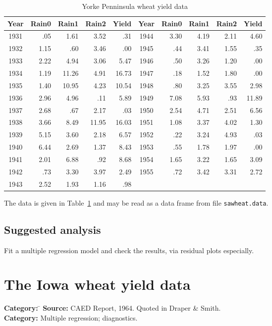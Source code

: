 \documentclass{article}
\newcommand{\strutt}{\vrule height 2.5ex depth 0.5ex width 0ex}%
\newcommand{\code}[1]{\texttt{#1}}
\begin{document}
\begin{table}[ht]
\begin{center}
\begin{tabular}{@{\protect\strutt}|crrrr|crrrr|}
\hline
Year & Rain0 & Rain1 & Rain2 & Yield & Year & Rain0 & Rain1 & Rain2 & Yield\\
\hline
  1931 &  .05 &  1.61 & 3.52 &   .31 & 1944 & 3.30 &  4.19 & 2.11 &  4.60\\
  1932 & 1.15 &   .60 & 3.46 &   .00 & 1945 &  .44 &  3.41 & 1.55 &   .35\\
  1933 & 2.22 &  4.94 & 3.06 &  5.47 & 1946 &  .50 &  3.26 & 1.20 &   .00\\
  1934 & 1.19 & 11.26 & 4.91 & 16.73 & 1947 &  .18 &  1.52 & 1.80 &   .00\\
  1935 & 1.40 & 10.95 & 4.23 & 10.54 & 1948 &  .80 &  3.25 & 3.55 &  2.98\\
  1936 & 2.96 &  4.96 &  .11 &  5.89 & 1949 & 7.08 &  5.93 &  .93 & 11.89\\
  1937 & 2.68 &   .67 & 2.17 &   .03 & 1950 & 2.54 &  4.71 & 2.51 &  6.56\\
  1938 & 3.66 &  8.49 & 11.95 & 16.03 & 1951 & 1.08 &  3.37 & 4.02 &  1.30\\
  1939 & 5.15 &  3.60 & 2.18 &  6.57 & 1952 &  .22 &  3.24 & 4.93 &   .03\\
  1940 & 6.44 &  2.69 & 1.37 &  8.43 & 1953 &  .55 &  1.78 & 1.97 &   .00\\
  1941 & 2.01 &  6.88 &  .92 &  8.68 & 1954 & 1.65 &  3.22 & 1.65 &  3.09\\
  1942 &  .73 &  3.30 & 3.97 &  2.49 & 1955 &  .72 &  3.42 & 3.31 &  2.72\\
  1943 & 2.52 &  1.93 & 1.16 &   .98 &      &      &       &       &\\
\hline
\end{tabular}
\end{center}

\caption{\label{sawheat} Yorke Penninsula wheat yield data}
\end{table}
The data is given in Table~\ref{sawheat} and may be read as a data frame from
file \code{sawheat.data}.

\subsection*{Suggested analysis}
Fit a multiple regression model and check the results, via residual plots
especially.


\clearpage\section{The Iowa wheat yield data}
\begin{tabbing}
\textbf{Category:} \= \kill
\textbf{Source:} \> CAED Report, 1964.  Quoted in Draper \& Smith.\\
\textbf{Category:} \>  Multiple regression; diagnostics.
\end{tabbing}
\end{document}
